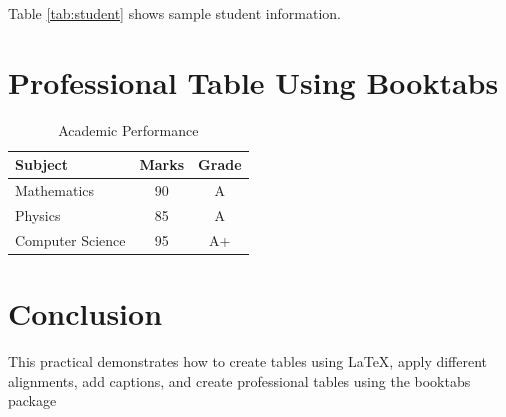 \documentclass[12pt,a4paper]{article}
\begin{document}
Table \ref{tab:student} shows sample student information.

\section{Professional Table Using Booktabs}

\begin{table}[h]
\centering
\caption{Academic Performance}

\begin{tabular}{lcc}
\toprule
Subject & Marks & Grade \\
\midrule
Mathematics & 90 & A \\
Physics & 85 & A \\
Computer Science & 95 & A+ \\
\bottomrule
\end{tabular}

\end{table}

\section{Conclusion}

This practical demonstrates how to create tables
using LaTeX, apply different alignments, add captions,
and create professional tables using the booktabs package
\end{document}
